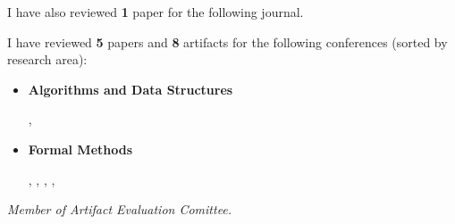 
I have also reviewed {\bf 1} paper for the following journal.

\smallskip


\smallskip

I have reviewed {\bf 5} papers and {\bf 8} artifacts for the following conferences (sorted by
research area):

\smallskip

\begin{itemize}
\item[] {\bf Algorithms and Data Structures}

  \smallskip

  , 

  \medskip

\item[] {\bf Formal Methods}

  \smallskip

  , , ,
  , 

\end{itemize}

\medskip

\textdagger\quad \emph{Member of Artifact Evaluation Comittee.} %

\medskip
